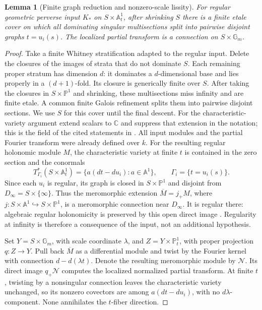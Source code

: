 \documentclass[11pt]{article}
\numberwithin{equation}{section}
\newtheorem{lemma}[lemma]{Lemma}
\theoremstyle{definition}
\theoremstyle{remark}
\newcommand{\C}{\mathbb C}
\newcommand{\A}{\mathbb A}
\newcommand{\Gm}{\mathbb G_m}
\newcommand{\Ncal}{\mathcal N}
\begin{document}
\begin{lemma}[Finite graph reduction and nonzero-scale lissity]\label{lem:graphs}\label{lem:nonzero-lisse}\label{lem:finite-graph}
For regular geometric perverse input $K_*$ on $S\times\A^1_t$, after
shrinking $S$ there is a finite etale cover on which all dominating
singular multisections split into pairwise disjoint graphs $t=u_i(s)$.
The localized partial transform is a connection on $S\times\Gm$.
\end{lemma}
\begin{proof}
Take a finite Whitney stratification adapted to the regular input. Delete
the closures of the images of strata that do not dominate $S$. Each
remaining proper stratum has dimension $d$: it dominates a $d$-dimensional
base and lies properly in a $(d+1)$-fold. Its closure is generically finite
over $S$. After taking the closures in $S\times\mathbb P^1$ and shrinking,
these multisections miss infinity and are finite etale. A common finite
Galois refinement splits them into pairwise disjoint sections. We use $S$
for this cover until the final descent. For the characteristic-variety
argument extend scalars to $\C$ and suppress that extension in the
notation; this is the field of the cited statements in \cite{HTT}.
All input modules and the partial Fourier transform were already defined
over $k$. For the resulting regular holonomic module $M$, the
characteristic variety at finite $t$ is contained in the zero section
and the conormals
\[
 T^*_{\Gamma_i}(S\times\A^1_t)
   =\{a(dt-du_i):a\in\A^1\},\qquad \Gamma_i=\{t=u_i(s)\}.
\]
Since each $u_i$ is regular, its graph is closed in $S\times\mathbb P^1$
and disjoint from $D_\infty=S\times\{\infty\}$. Thus the meromorphic
extension $\overline M=j_+M$, where
$j:S\times\A^1\hookrightarrow S\times\mathbb P^1$, is a meromorphic
connection near $D_\infty$. It is regular there: algebraic regular
holonomicity is preserved by this open direct image
\cite[Theorem~6.1.5(ii)]{HTT}. Regularity at infinity is therefore a
consequence of the input, not an additional hypothesis.

Set $Y=S\times\Gm$, with scale coordinate $\lambda$, and
$Z=Y\times\mathbb P^1_t$, with proper
projection $q:Z\to Y$. Pull back $\overline M$ as a differential module
and twist by the Fourier kernel with connection $d-d(\lambda t)$.
Denote the resulting meromorphic module by $\Ncal$. Its direct image
$q_+\Ncal$ computes the localized normalized partial transform. At finite
$t$, twisting by a nonsingular connection leaves the characteristic
variety unchanged, so its nonzero covectors are among $a(dt-du_i)$,
with no $d\lambda$-component. None annihilates the $t$-fiber direction.


\end{proof}
\end{document}
